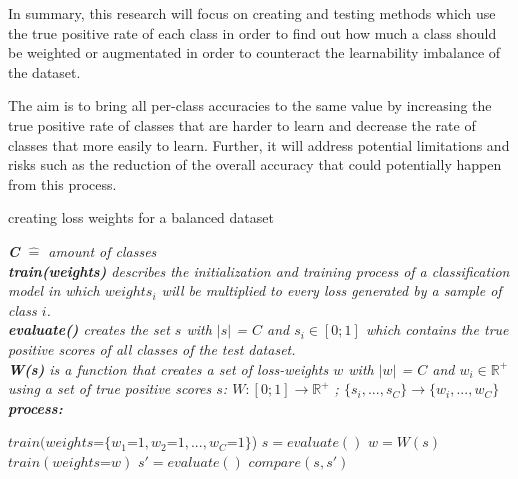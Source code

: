 \documentclass[journal]{IEEEtran}
\begin{document}
In summary, this research will focus on creating and testing methods which use the true positive rate of each class in order to find out how much a class should be weighted or augmentated in order to counteract the learnability imbalance of the dataset.

The aim is to bring all per-class accuracies to the same value by increasing the true positive rate of classes that are harder to learn 
and decrease the rate of classes that more easily to learn.
Further, it will address potential limitations and risks such as the reduction of the overall accuracy that could potentially happen from this process.

\begin{algorithm}[H]
        \caption{creating loss weights for a balanced dataset}

        \textit{\textbf{C} $\hat{=}$ amount of classes}
        \\ \textit{\textbf{train(weights)} describes the initialization and training process of a classification model in which $weights_i$ will be multiplied to every loss generated by a sample of class $i$.}
        \\ \textit{\textbf{evaluate()} creates the set $s$ with $\left|s\right|$ = $C$ and $s_i \in [0;1]$ which contains the true positive scores of all classes of the test dataset.}
        \\ \textit{\textbf{W(s)} is a function that creates a set of loss-weights $w$ with $\left|w\right|$ = $C$ and $w_i \in \mathbb{R}^{+}$ using a set of true positive scores $s$: $W: [0;1] \rightarrow \mathbb{R}^{+}$ ; $\{s_i,...,s_C\} \rightarrow \{w_i,...,w_C\}$ }
        \\ \textit{\textbf{process:}}
        \begin{algorithmic}[1]
         \STATE $train(weights\texttt{=}\{w_1\texttt{=}1, w_2\texttt{=}1, ..., w_C\texttt{=}1\}$)
         \STATE $s = evaluate()$
         \STATE $w = W(s)$
         \STATE $train(weights\texttt{=}w)$
         \STATE $s' = evaluate()$
         \STATE $compare(s, s')$

        \end{algorithmic}
\end{algorithm}
\end{document}
